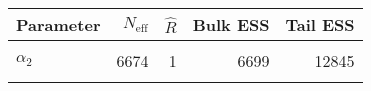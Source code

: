 \begin{table}[!h]
\centering
\begin{tabular}{>{\raggedright\arraybackslash}p{2cm}rrrr}
\toprule
Parameter & $N_{\text{eff}}$ & $\widehat{R}$ & Bulk ESS & Tail ESS\\
\midrule
\cellcolor{gray!6}{$\alpha_{0}$} & \cellcolor{gray!6}{5890} & \cellcolor{gray!6}{1} & \cellcolor{gray!6}{5920} & \cellcolor{gray!6}{10869}\\
$\alpha_{2}$ & 6674 & 1 & 6699 & 12845\\
\cellcolor{gray!6}{$\rho$} & \cellcolor{gray!6}{4737} & \cellcolor{gray!6}{1} & \cellcolor{gray!6}{4767} & \cellcolor{gray!6}{4389}\\
\bottomrule
\end{tabular}
\end{table}